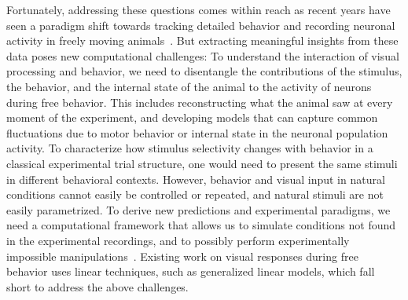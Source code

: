 \documentclass[COG,11pt]{ercgrant}
\begin{document}

Fortunately, addressing these questions comes within reach as recent years have seen a paradigm shift towards tracking detailed behavior and recording neuronal activity in freely moving animals~\parencite{Wallace2013-lf,Del_Grosso2017-ww,Mathis2018-lk,Cai2016-rh, Parker2022-ac}.
But extracting meaningful insights from these data poses new computational challenges:
 To understand the interaction of visual processing and behavior, we need to disentangle the contributions of the stimulus, the behavior, and the internal state of the animal to the activity of neurons during free behavior. 
This includes reconstructing what the animal saw at every moment of the experiment, and developing models that can capture common fluctuations due to motor behavior or internal state in the neuronal population activity.
 To characterize how stimulus selectivity changes with behavior in a classical experimental trial structure, one would need to present the same stimuli in different behavioral contexts. 
However, behavior and visual input in natural conditions cannot easily be controlled or repeated, and natural stimuli are not easily parametrized.
 To derive new predictions and experimental paradigms, we need a computational framework that allows us to simulate conditions not found in the experimental recordings, and to possibly perform experimentally impossible manipulations~\parencite{Walker2019-yw, Franke2022-do,Bashivan2019-ry}. Existing work on visual responses during free behavior uses linear techniques, such as generalized linear models, which fall short to address the above challenges.
\end{document}
